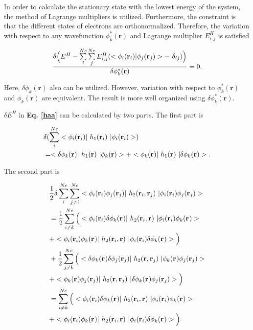 \documentclass[a4paper, 12pt, titlepage,oneside,drop]{kthesis}
\begin{document}
In order to calculate the stationary state with the lowest energy of the system, the method of Lagrange multipliers is utilized. Furthermore, the constraint is that the different states of electrons are orthonormalized.
Therefore, the variation with respect to any wavefunction $\phi^*_{k}(\textbf{r})$ and Lagrange multiplier $E_{i,j}^{H}$ is satisfied \cite{clasdft,bertsekas2003convex}

\begin{equation}\begin{split}\label{haa}
 \frac{ \delta  \Big(E^{{H}} - \sum\limits_{i}^{Ne} \sum\limits_{j}^{Ne} E_{i,j}^{H} (<\bwff<i><i> | \bwff<j><j>> -\ \delta_{ij})\Big)}{\delta \phi^*_{k}(\textbf{r})}  = 0. 
\end{split}
\end{equation}


Here, $ \delta \phi_{k}(\textbf{r})$ also can be utilized. However, variation with respect to $\phi^*_{k}(\textbf{r})$ and $\phi_{k}(\textbf{r})$ are equivalent. The result is more well organized using $\delta \phi^*_{k}(\textbf{r})$.

$\delta E^{{H}}$ in \textbf{Eq. \ref{haa}} can be calculated by two parts. The first part is 

\begin{equation}\begin{split}\label{hartree1}
&  \delta ( \sum\limits_i^{{Ne}} <\bwff<i><i> |\ h_1(\textbf{r}_{i})  \ | \bwff<i><i> > )  \\
& =  < \delta \phi_{{k}}(\textbf{r}) |\ h_1(\textbf{r})  \ |  \phi_{{k}}(\textbf{r}) >  +  < \phi_{{k}}(\textbf{r}) |\ h_1(\textbf{r})  \ | \delta \phi_{{k}}(\textbf{r}) >. 
\end{split}\end{equation}

The second part is

\begin{equation}\begin{split}\label{hartree2}
& \frac{1}{2} \delta \sum\limits_i^{{Ne}} \sum\limits_{j \neq i}^{{Ne}} <\bwff<i><i> \bwff<j><j>|\ h_2(\textbf{r}_{i},\textbf{r}_{j}) \ | \bwff<i><i> \bwff<j><j>> \\
& = \frac{1}{2}  \sum\limits_{i \neq k}^{{Ne}} \Big( <\bwff<i><i>  \delta \bwff<k><>|\ h_2(\textbf{r}_{i},\textbf{r}) \ | \bwff<i><i> \bwff<k><>> \\
& + <\bwff<i><i>  \bwff<k><>|\ h_2(\textbf{r}_{i},\textbf{r}) \ | \bwff<i><i> \delta \bwff<k><>> \Big) \\
& + \frac{1}{2}  \sum\limits_{j \neq k}^{{Ne}} \Big( <\delta \bwff<k><>  \delta \bwff<j><j>|\ h_2(\textbf{r},\textbf{r}_{j}) \ | \bwff<k><> \bwff<j><j>> \\
& + < \bwff<k><>  \bwff<j><j>|\ h_2(\textbf{r},\textbf{r}_{j}) \ | \delta \bwff<k><> \bwff<j><j>> \Big) \\
& =   \sum\limits_{i \neq k}^{{Ne}} \Big( <\bwff<i><i>  \delta \bwff<k><>|\ h_2(\textbf{r}_{i},\textbf{r}) \ | \bwff<i><i> \bwff<k><>> \\
& + <\bwff<i><i>  \bwff<k><>|\ h_2(\textbf{r}_{i},\textbf{r}) \ | \bwff<i><i> \delta \bwff<k><>> \Big). 
\end{split}\end{equation}
\end{document}
